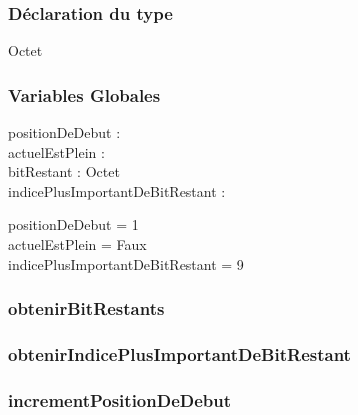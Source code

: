 \subsubsection{Déclaration du type}

\begin{algorithme}
    \begin{enregistrement}{Octet}
    \end{enregistrement}    
\end{algorithme}

\subsubsection{Variables Globales}

positionDeDebut : \entier \\
actuelEstPlein : \booleen \\
bitRestant : Octet \\
indicePlusImportantDeBitRestant : \entier

positionDeDebut = 1 \\
actuelEstPlein = Faux \\
indicePlusImportantDeBitRestant = 9\\

\subsubsection{obtenirBitRestants}

\begin{algorithme}
    {}
    {}
    {}
\end{algorithme}


\subsubsection{obtenirIndicePlusImportantDeBitRestant}

\begin{algorithme}
            {}
            {}
            {}
\end{algorithme}

\subsubsection{incrementPositionDeDebut}

